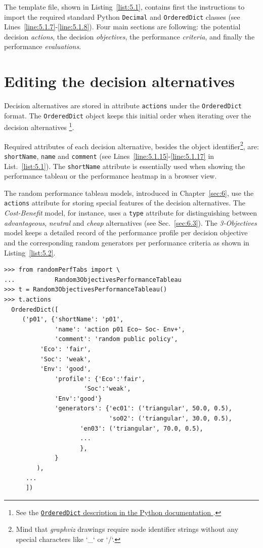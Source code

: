 The template file, shown in Listing~\vref{list:5.1}, contains first the instructions to import the required standard Python \texttt{Decimal} and \texttt{OrderedDict} classes (see Lines~\ref{line:5.1.7}-\ref{line:5.1.8}). Four main sections are following: the potential decision \emph{actions}, the decision \emph{objectives}, the performance \emph{criteria}, and finally the performance \emph{evaluations}.  

\section{Editing the decision alternatives}
\label{sec:5.2}

Decision alternatives are stored in attribute \texttt{actions} under the \texttt{OrderedDict} format. The \texttt{OrderedDict} object keeps this initial order when iterating over the decision alternatives \footnote{See the \href{https://docs.python.org/3/library/collections.html}{\texttt{OrderedDict} description in the Python documentation \citep{python}}.}.

Required attributes of each decision alternative, besides the object identifier\footnote{Mind that \emph{graphviz} drawings require node identifier strings without any special characters like `\_` or `/`.},  are: \texttt{shortName}, \texttt{name} and \texttt{comment} (see Lines~\ref{line:5.1.15}-\ref{line:5.1.17} in List.~\vref{list:5.1}). The \texttt{shortName} attribute is essentially used when showing the performance tableau or the performance heatmap in a browser view.

The random performance tableau models, introduced in Chapter~\ref{sec:6}, use the \texttt{actions} attribute for storing special features of the decision alternatives. The \emph{Cost-Benefit} model, for instance, uses a \texttt{type} attribute for distinguishing between \emph{advantageous}, \emph{neutral} and \emph{cheap} alternatives (see Sec.~\ref{sec:6.3}). The \emph{3-Objectives} model keeps a detailed record of the performance profile per decision objective and the corresponding random generators per performance criteria as shown in Listing~\vref{list:5.2}.
\begin{lstlisting}[caption={Example of decision alternative description},label=list:5.2]
>>> from randomPerfTabs import \
...           Random3ObjectivesPerformanceTableau
>>> t = Random3ObjectivesPerformanceTableau()
>>> t.actions
  OrderedDict([
     ('p01', {'shortName': 'p01',
              'name': 'action p01 Eco~ Soc- Env+',
              'comment': 'random public policy',
	      'Eco': 'fair',
	      'Soc': 'weak',
	      'Env': 'good',
              'profile': {'Eco':'fair',
	                  'Soc':'weak',
			  'Env':'good'}
              'generators': {'ec01': ('triangular', 50.0, 0.5),
                             'so02': ('triangular', 30.0, 0.5),
		             'en03': ('triangular', 70.0, 0.5),
		             ...
		             },
              }
         ),
      ...
      ])
\end{lstlisting}

